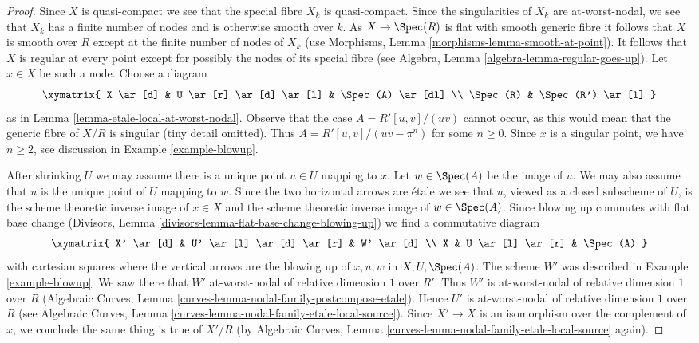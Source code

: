 \begin{proof}
Since $X$ is quasi-compact we see that the special fibre $X_k$ is quasi-compact.
Since the singularities of $X_k$ are at-worst-nodal, we see
that $X_k$ has a finite number of nodes and is otherwise
smooth over $k$. As $X \to \Spec(R)$ is flat with smooth generic
fibre it follows that $X$ is smooth over $R$ except at the
finite number of nodes of $X_k$
(use Morphisms, Lemma \ref{morphisms-lemma-smooth-at-point}).
It follows that $X$ is regular at every point except for possibly
the nodes of its special fibre
(see Algebra, Lemma \ref{algebra-lemma-regular-goes-up}).
Let $x \in X$ be such a node.
Choose a diagram
$$
\xymatrix{
X \ar[d] &
U \ar[r] \ar[d] \ar[l] &
\Spec(A) \ar[dl] \\
\Spec(R) &
\Spec(R') \ar[l]
}
$$
as in Lemma \ref{lemma-etale-local-at-worst-nodal}.
Observe that the case $A = R'[u, v]/(uv)$ cannot
occur, as this would mean that the generic fibre of
$X/R$ is singular (tiny detail omitted). Thus $A = R'[u, v]/(uv - \pi^n)$
for some $n \geq 0$. Since $x$ is a singular point,
we have $n \geq 2$, see discussion in
Example \ref{example-blowup}.

\medskip\noindent
After shrinking $U$ we may assume there is
a unique point $u \in U$ mapping to $x$.
Let $w \in \Spec(A)$ be the image of $u$.
We may also assume that $u$ is the unique point of $U$
mapping to $w$.
Since the two horizontal arrows are \'etale
we see that $u$, viewed as a closed subscheme of $U$,
is the scheme theoretic inverse image of $x \in X$ and the
scheme theoretic inverse image of $w \in \Spec(A)$.
Since blowing up commutes with flat base change
(Divisors, Lemma \ref{divisors-lemma-flat-base-change-blowing-up})
we find a commutative diagram
$$
\xymatrix{
X' \ar[d] &
U' \ar[l] \ar[d] \ar[r] &
W' \ar[d] \\
X & U \ar[l] \ar[r] & \Spec(A)
}
$$
with cartesian squares where the vertical arrows are the blowing
up of $x, u, w$ in $X, U, \Spec(A)$. The scheme $W'$ was described
in Example \ref{example-blowup}. We saw there that $W'$
at-worst-nodal of relative dimension $1$ over $R'$. Thus
$W'$ is at-worst-nodal of relative dimension $1$ over $R$
(Algebraic Curves, Lemma \ref{curves-lemma-nodal-family-postcompose-etale}).
Hence $U'$ is at-worst-nodal of relative dimension $1$ over $R$ (see
Algebraic Curves, Lemma \ref{curves-lemma-nodal-family-etale-local-source}).
Since $X' \to X$ is an isomorphism over the complement of $x$,
we conclude the same thing is true of $X'/R$ (by
Algebraic Curves, Lemma \ref{curves-lemma-nodal-family-etale-local-source}
again).


\end{proof}
